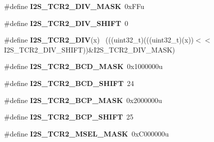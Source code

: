 \begin{DoxyCompactItemize}
\item 
\hypertarget{group___i2_s___register___masks_ga9bbd597b1d3a839f74d15c3b6c309bb7}{}\#define {\bfseries I2\+S\+\_\+\+T\+C\+R2\+\_\+\+D\+I\+V\+\_\+\+M\+A\+S\+K}~0x\+F\+Fu\label{group___i2_s___register___masks_ga9bbd597b1d3a839f74d15c3b6c309bb7}

\item 
\hypertarget{group___i2_s___register___masks_gad553f8b1c1cc03ded483d997640b410a}{}\#define {\bfseries I2\+S\+\_\+\+T\+C\+R2\+\_\+\+D\+I\+V\+\_\+\+S\+H\+I\+F\+T}~0\label{group___i2_s___register___masks_gad553f8b1c1cc03ded483d997640b410a}

\item 
\hypertarget{group___i2_s___register___masks_ga5e139ccca8c7599f321f14dce3b8782b}{}\#define {\bfseries I2\+S\+\_\+\+T\+C\+R2\+\_\+\+D\+I\+V}(x)                                                ~(((uint32\+\_\+t)(((uint32\+\_\+t)(x))$<$$<$I2\+S\+\_\+\+T\+C\+R2\+\_\+\+D\+I\+V\+\_\+\+S\+H\+I\+F\+T))\&I2\+S\+\_\+\+T\+C\+R2\+\_\+\+D\+I\+V\+\_\+\+M\+A\+S\+K)\label{group___i2_s___register___masks_ga5e139ccca8c7599f321f14dce3b8782b}

\item 
\hypertarget{group___i2_s___register___masks_gacd5946c8455382794be20e9454c7d688}{}\#define {\bfseries I2\+S\+\_\+\+T\+C\+R2\+\_\+\+B\+C\+D\+\_\+\+M\+A\+S\+K}~0x1000000u\label{group___i2_s___register___masks_gacd5946c8455382794be20e9454c7d688}

\item 
\hypertarget{group___i2_s___register___masks_ga2c6578a7b0e95314b9211083cd31494e}{}\#define {\bfseries I2\+S\+\_\+\+T\+C\+R2\+\_\+\+B\+C\+D\+\_\+\+S\+H\+I\+F\+T}~24\label{group___i2_s___register___masks_ga2c6578a7b0e95314b9211083cd31494e}

\item 
\hypertarget{group___i2_s___register___masks_gacd80d1c94434950d1e8bd33024b04018}{}\#define {\bfseries I2\+S\+\_\+\+T\+C\+R2\+\_\+\+B\+C\+P\+\_\+\+M\+A\+S\+K}~0x2000000u\label{group___i2_s___register___masks_gacd80d1c94434950d1e8bd33024b04018}

\item 
\hypertarget{group___i2_s___register___masks_gaafb7626321ba09185e45c9136b804732}{}\#define {\bfseries I2\+S\+\_\+\+T\+C\+R2\+\_\+\+B\+C\+P\+\_\+\+S\+H\+I\+F\+T}~25\label{group___i2_s___register___masks_gaafb7626321ba09185e45c9136b804732}

\item 
\hypertarget{group___i2_s___register___masks_ga69d35574d74902b5a5dac263afe83957}{}\#define {\bfseries I2\+S\+\_\+\+T\+C\+R2\+\_\+\+M\+S\+E\+L\+\_\+\+M\+A\+S\+K}~0x\+C000000u\label{group___i2_s___register___masks_ga69d35574d74902b5a5dac263afe83957}


\end{DoxyCompactItemize}
